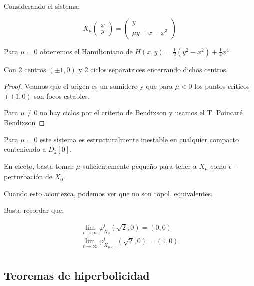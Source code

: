 \begin{exmp}
	Considerando el sistema:
	
	\begin{equation*}
		X_\mu \begin{pmatrix}
			x\\
			y
		\end{pmatrix} = \begin{pmatrix}
			y\\
			\mu y + x - x^3
		\end{pmatrix}
	\end{equation*}
	
	Para $\mu = 0$ obtenemos el Hamiltoniano de $H(x,y)= \frac{1}{2}(y^2-x^2) + \frac{1}{4}x^4$
	
	Con 2 centros $(\pm 1,0)$ y 2 ciclos separatrices encerrando dichos centros.
	
	\begin{proof}
		Veamos que el origen es un sumidero y que para $\mu <0$ los puntos críticos $(\pm1,0)$ son focos estables.
		
		Para $\mu \neq 0$ no hay ciclos por el criterio de Bendixson y usamos el T. Poincaré Bendixson
		
	\end{proof}
	
	Para $\mu = 0$ este sistema es estructuralmente inestable en cualquier compacto conteniendo a $D_2[0]$. 
	
	En efecto, basta tomar $\mu$ suficientemente pequeño para tener a $X_\mu$ como $\epsilon-$perturbación de $X_0$.
	
	Cuando esto acontezca, podemos ver que no son topol. equivalentes.
	
	Basta recordar que:
	
	\begin{align*}
		\lim_{t\to \infty } \varphi^t_{X_0}(\sqrt{2},0) = (0,0)\\
		
		\lim_{t\to \infty } \varphi^t_{X_{\mu<0}}(\sqrt{2},0) = (1,0)\\
	\end{align*}
	
\end{exmp}



\subsection{Teoremas de hiperbolicidad}

